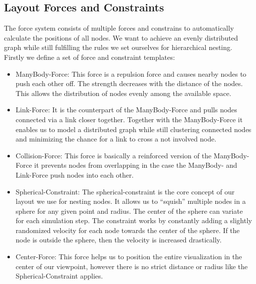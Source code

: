 \subsection{Layout Forces and Constraints}
\label{chap:ps-forces}
The force system consists of multiple forces and constrains to automatically calculate the positions of all nodes. We want to achieve an evenly distributed graph while still fulfilling the rules we set ourselves for hierarchical nesting. Firstly we define a set of force and constraint templates:
\begin{itemize}
    \item ManyBody-Force: This force is a repulsion force and causes nearby nodes to push each other off. The strength decreases with the distance of the nodes. This allows the distribution of nodes evenly among the available space.
    \item Link-Force: It is the counterpart of the ManyBody-Force and pulls nodes connected via a link closer together. Together with the ManyBody-Force it enables us to model a distributed graph while still clustering connected nodes and minimizing the chance for a link to cross a not involved node.
    \item Collision-Force: This force is basically a reinforced version of the ManyBody-Force it prevents nodes from overlapping in the case the ManyBody- and Link-Force push nodes into each other.
    \item Spherical-Constraint: The spherical-constraint is the core concept of our layout we use for nesting nodes. It allows us to “squish” multiple nodes in a sphere for any given point and radius. The center of the sphere can variate for each simulation step. The constraint works by constantly adding a slightly randomized velocity for each node towards the center of the sphere. If the node is outside the sphere, then the velocity is increased drastically.
    \item Center-Force: This force helps us to position the entire visualization in the center of our viewpoint, however there is no strict distance or radius like the Spherical-Constraint applies.
\end{itemize}

